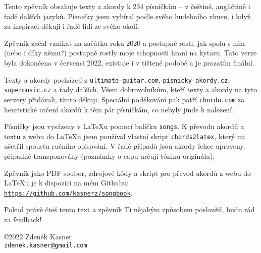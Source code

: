 \documentclass{article}
\begin{document}

 \leavevmode\thispagestyle{empty}

\begin{center}
  \vfill

  Tento zpěvník obsahuje texty a akordy k 234 písničkám -- v češtině, angličtině i řadě dalších jazyků. Písničky jsem vybíral podle svého hudebního vkusu, i když za inspiraci děkuji i řadě lidí ze svého okolí.  \\ \vspace*{0.5cm}

Zpěvník začal vznikat na začátku roku 2020 a postupně rostl, jak spolu s ním (nebo i díky němu?) postupně rostly moje schopnosti hraní na kytaru. Tato verze byla dokončena v červenci 2022, existuje i v tištené podobě a je prozatím finální. \\ \vspace*{0.5cm}

  Texty a akordy pocházejí z \texttt{ultimate-guitar.com}, \texttt{pisnicky-akordy.cz}, \texttt{supermusic.cz} a řady dalších. Všem dobrovolníkům, kteří texty a akordy na tyto servery přidávali, tímto děkuji. Speciální poděkování pak patří \texttt{chordu.com} za heuristické určení akordů k těm pár písničkám, co nebyly jinde k nalezení.  \\ \vspace*{0.5cm}

  Písničky jsou vysázeny v \LaTeX u pomocí balíčku \texttt{songs}. K převodu akordů a textu z webu do \LaTeX u jsem používal vlastní skript \texttt{chords2latex}, který mi ušetřil spoustu ručního opisování. V řadě případů jsou akordy lehce upraveny, případně transponovány (poznámky o capu určují tóninu originálu). \\ \vspace*{0.5cm}

  Zpěvník jako PDF soubor, zdrojové kódy a skript pro převod akordů z webu do \LaTeX u je k dispozici na mém Githubu: \texttt{\url{https://github.com/kasnerz/songbook}}.  \\ \vspace*{0.5cm}

  Pokud právě čteš tento text a zpěvník Ti nějakým způsobem posloužil, budu rád za feedback! \\ \vspace*{0.5cm}

 
\copyright 2022 Zdeněk Kasner \\ \vspace*{0.1cm}
\texttt{zdenek.kasner@gmail.com} \\ \vspace*{0.5cm}
\byncsa
\end{center}
\end{document}
